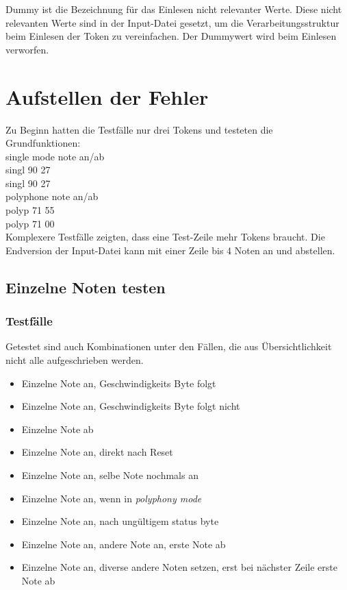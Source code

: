 Dummy ist die Bezeichnung für das Einlesen nicht relevanter Werte. Diese nicht relevanten Werte sind in der Input-Datei gesetzt, um die Verarbeitungsstruktur beim Einlesen der Token zu vereinfachen. Der Dummywert wird beim Einlesen verworfen.\\
 
\section{Aufstellen der Fehler}\label{sec.testbench_fehler} 

Zu Beginn hatten die Testfälle nur drei Tokens und testeten die Grundfunktionen:\\

single mode note an/ab\\
singl 90 27\\ 
singl 90 27\\

polyphone note an/ab\\
polyp 71 55\\
polyp 71 00\\

Komplexere Testfälle zeigten, dass eine Test-Zeile mehr Tokens braucht. Die Endversion der Input-Datei kann mit einer Zeile bis 4 Noten an und abstellen.


\subsection{Einzelne Noten testen}
 
\subsubsection{Testfälle}
Getestet sind auch Kombinationen unter den Fällen, die aus Übersichtlichkeit nicht alle aufgeschrieben werden.\\
\begin{itemize}
\item Einzelne Note an, Geschwindigkeits Byte folgt
\item Einzelne Note an, Geschwindigkeits Byte folgt nicht
\item Einzelne Note ab
\item Einzelne Note an, direkt nach Reset
\item Einzelne Note an, selbe Note nochmals an
\item Einzelne Note an, wenn in \textit{polyphony mode}
\item Einzelne Note an, nach ungültigem status byte
\item Einzelne Note an, andere Note an, erste Note ab
\item Einzelne Note an, diverse andere Noten setzen, erst bei nächster Zeile erste Note ab
\end{itemize}

